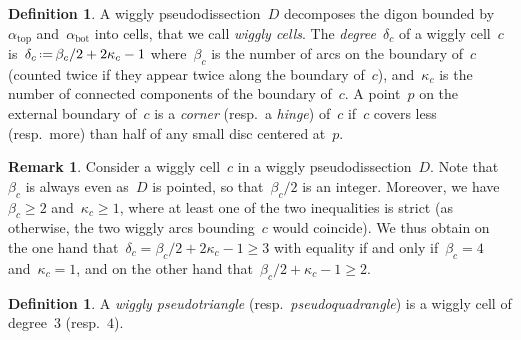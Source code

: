 \documentclass{amsart}
\theoremstyle{definition}
\newtheorem{definition}[theorem]{Definition}
\newtheorem{remark}[theorem]{Remark}
\newcommand{\eqdef}{\mbox{\,\raisebox{0.2ex}{\scriptsize\ensuremath{\mathrm:}}\ensuremath{=}\,}} %
\newcommand{\darkblue}{\color{darkblue}} %
\newcommand{\defn}[1]{\textsl{\darkblue #1}} %
\newcommand{\vincent}[1]{\todo[color=blue!30]{\rm #1 \\ \hfill --- V.}}
\begin{document}

\begin{definition}
A wiggly pseudodissection~$D$ decomposes the digon bounded by~$\alpha_\mathrm{top}$ and~$\alpha_\mathrm{bot}$ into cells, that we call \defn{wiggly cells}.
The \defn{degree}~$\delta_c$ of a wiggly cell~$c$ is~$\delta_c \eqdef \beta_c/2+2\kappa_c-1$ where~$\beta_c$ is the number of arcs on the boundary of~$c$ (counted twice if they appear twice along the boundary of~$c$), and~$\kappa_c$ is the number of connected components of the boundary of~$c$.
A point~$p$ on the external boundary of~$c$ is a \defn{corner} (resp.~a \defn{hinge}) of~$c$ if~$c$ covers less (resp.~more) than half of any small disc centered at~$p$.
\end{definition}

\begin{remark}
\label{rem:degree}
Consider a wiggly cell~$c$ in a wiggly pseudodissection~$D$.
Note that~$\beta_c$ is always even as~$D$ is pointed, so that~$\beta_c/2$ is an integer.
Moreover, we have~$\beta_c \ge 2$ and~$\kappa_c \ge 1$, where at least one of the two inequalities is strict (as otherwise, the two wiggly arcs bounding~$c$ would coincide).
We thus obtain on the one hand that~$\delta_c = \beta_c/2+2\kappa_c-1 \ge 3$ with equality if and only if~$\beta_c = 4$ and~$\kappa_c = 1$, and on the other hand that~$\beta_c/2+\kappa_c-1 \ge 2$.
\end{remark}

\begin{definition}
A \defn{wiggly pseudotriangle} (resp.~\defn{pseudoquadrangle}) is a wiggly cell of degree~$3$ (resp.~$4$).
\end{definition}
\end{document}
